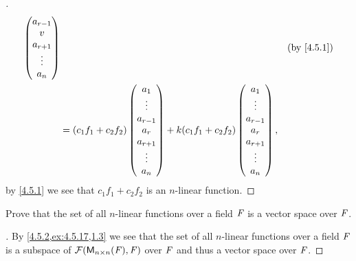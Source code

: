 \begin{proof}[]
\begin{align*}
\begin{pmatrix}
                                                 a_{r - 1} \\
                                                 v         \\
                                                 a_{r + 1} \\
                                                 \vdots    \\
                                                 a_n
                                               \end{pmatrix}             &  & \text{(by \cref{4.5.1})} \\
     & = (c_1 f_1 + c_2 f_2)\begin{pmatrix}
                              a_1       \\
                              \vdots    \\
                              a_{r - 1} \\
                              a_r       \\
                              a_{r + 1} \\
                              \vdots    \\
                              a_n
                            \end{pmatrix} + k (c_1 f_1 + c_2 f_2)\begin{pmatrix}
                                                                   a_1       \\
                                                                   \vdots    \\
                                                                   a_{r - 1} \\
                                                                   a_r       \\
                                                                   a_{r + 1} \\
                                                                   \vdots    \\
                                                                   a_n
                                                                 \end{pmatrix},
  \end{align*}
  by \cref{4.5.1} we see that \(c_1 f_1 + c_2 f_2\) is an \(n\)-linear function.
\end{proof}

\begin{ex}\label{ex:4.5.18}
  Prove that the set of all \(n\)-linear functions over a field \(\mathit{F}\) is a vector space over \(\mathit{F}\).
\end{ex}

\begin{proof}[]
  By \cref{4.5.2,ex:4.5.17,1.3} we see that the set of all \(n\)-linear functions over a field \(\mathit{F}\) is a subspace of \(\mathcal{F}(\mathsf{M}_{{n} \times n}({\mathit{F}}), \mathit{F})\) over \(\mathit{F}\) and thus a vector space over \(\mathit{F}\).
\end{proof}
